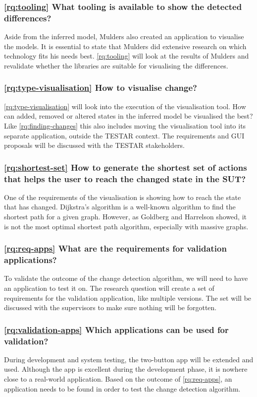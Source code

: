 \subsubsection{\ref{rq:tooling} What tooling is available to show the detected differences?}
Aside from the inferred model, Mulders also created an application to visualise the models. It is essential to state that Mulders did extensive research on which technology fits his needs best. \ref{rq:tooling} will look at the results of Mulders and revalidate whether the libraries are suitable for visualising the differences. 

\subsubsection{\ref{rq:type-visualisation} How to visualise change?}
\ref{rq:type-visualisation} will look into the execution of the visualisation tool. How can added, removed or altered states in the inferred model be visualised the best? Like \ref{rq:finding-changes} this also includes moving the visualisation tool into its separate application, outside the TESTAR context. The requirements and GUI proposals will be discussed with the TESTAR stakeholders. 

\subsubsection{\ref{rq:shortest-set} How to generate the shortest set of actions that helps the user to reach the changed state in the SUT?}
One of the requirements of the visualisation is showing how to reach the state that has changed. Dijkstra's algorithm \cite{dijkstra1959note} is a well-known algorithm to find the shortest path for a given graph. However, as Goldberg and Harrelson \cite{goldberg2005computing} showed, it is not the most optimal shortest path algorithm, especially with massive graphs. 

\subsubsection{\ref{rq:req-apps} What are the requirements for validation applications?}
To validate the outcome of the change detection algorithm, we will need to have an application to test it on. The research question will create a set of requirements for the validation application, like multiple versions. The set will be discussed with the supervisors to make sure nothing will be forgotten.

\subsubsection{\ref{rq:validation-apps} Which applications can be used for validation?}
During development and system testing, the two-button app will be extended and used. Although the app is excellent during the development phase, it is nowhere close to a real-world application. Based on the outcome of \ref{rq:req-apps}, an application needs to be found in order to test the change detection algorithm.

